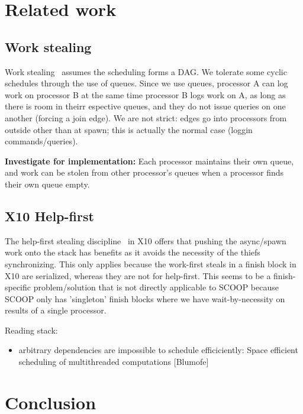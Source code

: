 \documentclass[a4]{article}
\begin{document}
\section{Related work}
\subsection{Work stealing}

Work stealing~\cite{blumofe:1994:scheduling} assumes the scheduling
forms a DAG. 
We tolerate some cyclic schedules through the use of queues.
Since we use queues, processor A can log work on processor B at the 
same time processor B logs work on A, as long as there is room in theirr
espective queues, and they do not issue queries on one another
(forcing a join edge).
We are not strict: edges go into processors from outside other than at spawn;
this is actually the normal case (loggin commands/queries).

\textbf{Investigate for implementation:}
Each processor maintains their own queue, and work can be stolen from
other processor's queues when a processor finds their own queue empty.

\subsection{X10 Help-first}
The help-first stealing discipline~\cite{guo:2009:work} in X10
offers that pushing the async/spawn work onto the stack has benefits
as it avoids the necessity of the thiefs synchronizing.
This only applies because the work-first steals 
in a finish block in X10 are serialized, 
whereas they are not for help-first.
This seems to be a finish-specific problem/solution
that is not directly applicable to SCOOP because
SCOOP only has 'singleton' finish blocks where we have wait-by-necessity
on results of a single  processor.

Reading stack:

\begin{itemize}
\item arbitrary dependencies are impossible to schedule efficiciently:
  Space efficient scheduling of multithreaded computations [Blumofe]
\end{itemize}

\section{Conclusion}

{}

\end{document}
